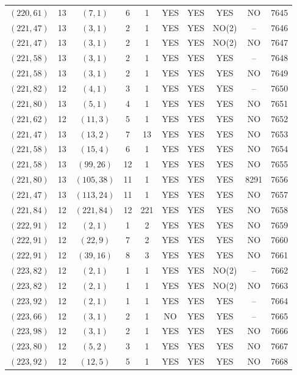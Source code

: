 \begin{longtable}{|c|c|c|c|c|c|c|c|c|c|}
$(220, 61)$ & 13 & $(7, 1)$ & 6 & 1 & YES & YES & YES & NO & 7645\\
$(221, 47)$ & 13 & $(3, 1)$ & 2 & 1 & YES & YES & NO(2) & -- & 7646\\
$(221, 47)$ & 13 & $(3, 1)$ & 2 & 1 & YES & YES & NO(2) & NO & 7647\\
$(221, 58)$ & 13 & $(3, 1)$ & 2 & 1 & YES & YES & YES & -- & 7648\\
$(221, 58)$ & 13 & $(3, 1)$ & 2 & 1 & YES & YES & YES & NO & 7649\\
$(221, 82)$ & 12 & $(4, 1)$ & 3 & 1 & YES & YES & YES & -- & 7650\\
$(221, 80)$ & 13 & $(5, 1)$ & 4 & 1 & YES & YES & YES & NO & 7651\\
$(221, 62)$ & 12 & $(11, 3)$ & 5 & 1 & YES & YES & YES & NO & 7652\\
$(221, 47)$ & 13 & $(13, 2)$ & 7 & 13 & YES & YES & YES & NO & 7653\\
$(221, 58)$ & 13 & $(15, 4)$ & 6 & 1 & YES & YES & YES & NO & 7654\\
$(221, 58)$ & 13 & $(99, 26)$ & 12 & 1 & YES & YES & YES & NO & 7655\\
$(221, 80)$ & 13 & $(105, 38)$ & 11 & 1 & YES & YES & YES & 8291 & 7656\\
$(221, 47)$ & 13 & $(113, 24)$ & 11 & 1 & YES & YES & YES & NO & 7657\\
$(221, 84)$ & 12 & $(221, 84)$ & 12 & 221 & YES & YES & YES & NO & 7658\\
$(222, 91)$ & 12 & $(2, 1)$ & 1 & 2 & YES & YES & YES & NO & 7659\\
$(222, 91)$ & 12 & $(22, 9)$ & 7 & 2 & YES & YES & YES & NO & 7660\\
$(222, 91)$ & 12 & $(39, 16)$ & 8 & 3 & YES & YES & YES & NO & 7661\\
$(223, 82)$ & 12 & $(2, 1)$ & 1 & 1 & YES & YES & NO(2) & -- & 7662\\
$(223, 82)$ & 12 & $(2, 1)$ & 1 & 1 & YES & YES & NO(2) & NO & 7663\\
$(223, 92)$ & 12 & $(2, 1)$ & 1 & 1 & YES & YES & YES & -- & 7664\\
$(223, 66)$ & 12 & $(3, 1)$ & 2 & 1 & NO & YES & YES & -- & 7665\\
$(223, 98)$ & 12 & $(3, 1)$ & 2 & 1 & YES & YES & YES & NO & 7666\\
$(223, 80)$ & 12 & $(5, 2)$ & 3 & 1 & YES & YES & YES & NO & 7667\\
$(223, 92)$ & 12 & $(12, 5)$ & 5 & 1 & YES & YES & YES & NO & 7668\\

\end{longtable}

